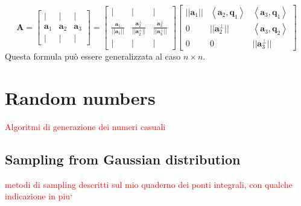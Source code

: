 \documentclass[10pt]{article}
\begin{document}
\begin{equation}
\mathbf{A} = 
\begin{bmatrix}
| & | & | \\
\mathbf{a}_1 & \mathbf{a}_2 & \mathbf{a}_3 \\
| & | & |
\end{bmatrix} = 
\begin{bmatrix}
| & | & | \\
\frac{\mathbf{a}_1}{||\mathbf{a}_1||} & \frac{\mathbf{a}_2^\perp}{||\mathbf{a}_2^\perp||} & \frac{\mathbf{a}_3^\perp}{||\mathbf{a}_3^\perp||} \\
| & | & |
\end{bmatrix}
\begin{bmatrix}
||\mathbf{a}_1|| & \left<\mathbf{a}_2,\mathbf{q}_1\right> & \left<\mathbf{a}_3,\mathbf{q}_1\right> \\
0 & ||\mathbf{a}_2^\perp|| & \left<\mathbf{a}_3,\mathbf{q}_2\right> \\
0 & 0 & ||\mathbf{a}_3^\perp||
\end{bmatrix}
\end{equation}
Questa formula può essere generalizzata al caso $n\times n$.
















\newpage

\appendix

\section{Random numbers}

\textcolor{red}{Algoritmi di generazione dei numeri casuali}

\subsection{Sampling from Gaussian distribution}

\textcolor{red}{metodi di sampling descritti sul mio quaderno dei ponti integrali, con qualche indicazione in piu`}
\end{document}
